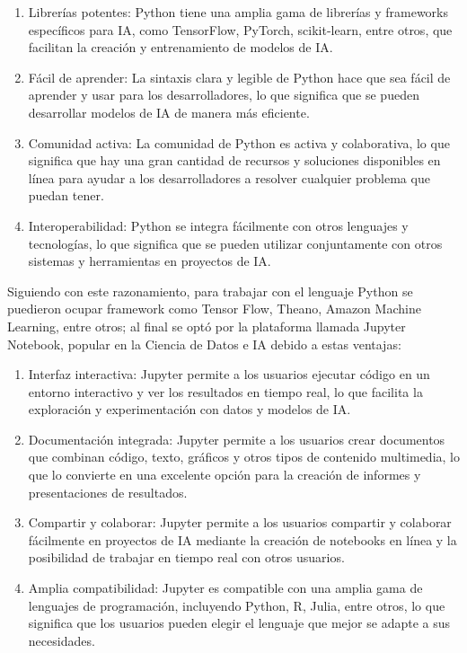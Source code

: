 \begin{enumerate}
	\item Librerías potentes: Python tiene una amplia gama de librerías y frameworks específicos para IA, como TensorFlow, PyTorch, scikit-learn, entre otros, que facilitan la creación y entrenamiento de modelos de IA.
	\item Fácil de aprender: La sintaxis clara y legible de Python hace que sea fácil de aprender y usar para los desarrolladores, lo que significa que se pueden desarrollar modelos de IA de manera más eficiente.
	\item Comunidad activa: La comunidad de Python es activa y colaborativa, lo que significa que hay una gran cantidad de recursos y soluciones disponibles en línea para ayudar a los desarrolladores a resolver cualquier problema que puedan tener.
	\item Interoperabilidad: Python se integra fácilmente con otros lenguajes y tecnologías, lo que significa que se pueden utilizar conjuntamente con otros sistemas y herramientas en proyectos de IA.\\
\end{enumerate}

\par Siguiendo con este razonamiento, para trabajar con el lenguaje Python se puedieron ocupar framework como Tensor Flow, Theano, Amazon Machine Learning, entre otros; al final se optó por la plataforma llamada Jupyter Notebook, popular en la Ciencia de Datos e IA debido a estas ventajas:

\begin{enumerate}
	\item Interfaz interactiva: Jupyter permite a los usuarios ejecutar código en un entorno interactivo y ver los resultados en tiempo real, lo que facilita la exploración y experimentación con datos y modelos de IA.
	\item Documentación integrada: Jupyter permite a los usuarios crear documentos que combinan código, texto, gráficos y otros tipos de contenido multimedia, lo que lo convierte en una excelente opción para la creación de informes y presentaciones de resultados.
	\item Compartir y colaborar: Jupyter permite a los usuarios compartir y colaborar fácilmente en proyectos de IA mediante la creación de notebooks en línea y la posibilidad de trabajar en tiempo real con otros usuarios.
	\item Amplia compatibilidad: Jupyter es compatible con una amplia gama de lenguajes de programación, incluyendo Python, R, Julia, entre otros, lo que significa que los usuarios pueden elegir el lenguaje que mejor se adapte a sus necesidades.\\
\end{enumerate}













